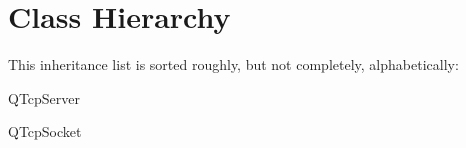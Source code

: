 \section{Class Hierarchy}
This inheritance list is sorted roughly, but not completely, alphabetically\+:\begin{DoxyCompactList}
\item {}
\item Q\+Tcp\+Server\begin{DoxyCompactList}
\item {}
\end{DoxyCompactList}
\item Q\+Tcp\+Socket\begin{DoxyCompactList}
\item {}
\end{DoxyCompactList}
\end{DoxyCompactList}
